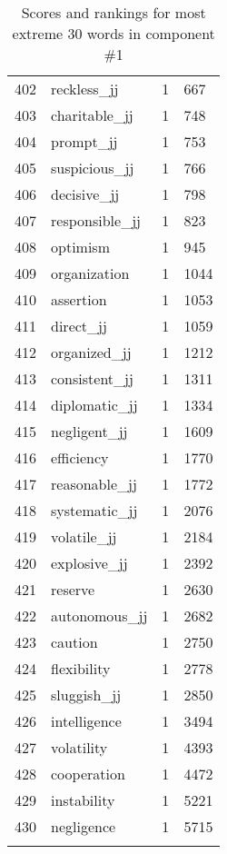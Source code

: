 \begin{longtable}[!htbp]{| rlr@{.}l |}
    402 & reckless\_jj & 1 & 667 \\
    403 & charitable\_jj & 1 & 748 \\
    404 & prompt\_jj & 1 & 753 \\
    405 & suspicious\_jj & 1 & 766 \\
    406 & decisive\_jj & 1 & 798 \\
    407 & responsible\_jj & 1 & 823 \\
    408 & optimism & 1 & 945 \\
    409 & organization & 1 & 1044 \\
    410 & assertion & 1 & 1053 \\
    411 & direct\_jj & 1 & 1059 \\
    412 & organized\_jj & 1 & 1212 \\
    413 & consistent\_jj & 1 & 1311 \\
    414 & diplomatic\_jj & 1 & 1334 \\
    415 & negligent\_jj & 1 & 1609 \\
    416 & efficiency & 1 & 1770 \\
    417 & reasonable\_jj & 1 & 1772 \\
    418 & systematic\_jj & 1 & 2076 \\
    419 & volatile\_jj & 1 & 2184 \\
    420 & explosive\_jj & 1 & 2392 \\
    421 & reserve & 1 & 2630 \\
    422 & autonomous\_jj & 1 & 2682 \\
    423 & caution & 1 & 2750 \\
    424 & flexibility & 1 & 2778 \\
    425 & sluggish\_jj & 1 & 2850 \\
    426 & intelligence & 1 & 3494 \\
    427 & volatility & 1 & 4393 \\
    428 & cooperation & 1 & 4472 \\
    429 & instability & 1 & 5221 \\
    430 & negligence & 1 & 5715 \\
    \hline
    \caption{Scores and rankings for most extreme 30 words in component \#1} \\
\end{longtable}
